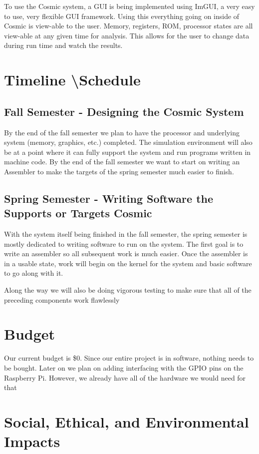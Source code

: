 \documentclass[conference]{IEEEtran}
\begin{document}
To use the Cosmic system, a GUI is being implemented using ImGUI, a very easy to use, very flexible GUI framework. Using this everything going on inside of Cosmic is view-able to the user. Memory, registers, ROM, processor states are all view-able at any given time for analysis. This allows for the user to change data during run time and watch the results.


\section{Timeline \textbackslash Schedule}

\subsection{Fall Semester - Designing the Cosmic System}
By the end of the fall semester we plan to have the processor and underlying system (memory, graphics, etc.) completed. The simulation environment will also be at a point where it can fully support the system and run programs written in machine code. By the end of the fall semester we want to start on writing an Assembler to make the targets of the spring semester much easier to finish.

\subsection{Spring Semester - Writing Software the Supports or Targets Cosmic}
With the system itself being finished in the fall semester, the spring semester is mostly dedicated to writing software to run on the system. The first goal is to write an assembler so all subsequent work is much easier. Once the assembler is in a usable state, work will begin on the kernel for the system and basic software to go along with it.


Along the way we will also be doing vigorous testing to make sure that all of the preceding components work flawlessly

\section{Budget}

Our current budget is \$0. Since our entire project is in software, nothing needs to be bought. Later on we plan on adding interfacing with the GPIO pins on the Raspberry Pi. However, we already have all of the hardware we would need for that
\section{Social, Ethical, and Environmental Impacts} 
\end{document}
